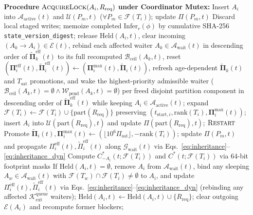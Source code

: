 \documentclass[conference,10pt]{IEEEtran}
\begin{document}
\begin{algorithm}[t]
\caption{EPCP Atomic Lock Acquisition \& Release}
\label{alg:epcp}
\begin{algorithmic}[1]
\small
\STATE \textbf{Procedure} $\textsc{AcquireLock}(A_i, R_{\text{req}})$ \textbf{under Coordinator Mutex:}
    \STATE Insert $A_i$ into $\mathcal{A}_{\text{active}}(t)$ and $\mathcal{U}(P_m, t)$ ($\forall P_m \in \mathcal{F}(T_i)$); update $\Pi(P_m, t)$
\ENDIF
{}
    \STATE Discard local staged writes; memoize completed $\text{Infer}_r(\phi)$ by cumulative SHA-256 \texttt{state\_version\_digest}; release $\text{Held}(A_i, t)$, clear incoming $(A_k \to A_i) \in \mathcal{E}(t)$, rebind each affected waiter $A_k \in \mathcal{A}_{\text{wait}}(t)$ in descending order of $\tilde{\mathbf{\Pi}}_k^{\text{eff}}(t)$ to its full recomputed $\mathcal{B}_{\text{ceil}}(A_k, t)$, reset $(\mathbf{\Pi}_i^{\text{eff}}(t), \tilde{\mathbf{\Pi}}_i^{\text{eff}}(t)) \leftarrow (\mathbf{\Pi}_i^{\max}(t), \tilde{\mathbf{\Pi}}_i(t))$, refresh age-dependent $\tilde{\mathbf{\Pi}}_k(t)$ and $T_{\text{sat}}$ promotions, and wake the highest-priority admissible waiter ($\mathcal{B}_{\text{ceil}}(A_k, t)=\emptyset \land \mathcal{W}_{\text{pend}}(A_k, t)=\emptyset$) per freed disjoint partition component in descending order of $\tilde{\mathbf{\Pi}}_k^{\text{eff}}(t)$ while keeping $A_i \in \mathcal{A}_{\text{active}}(t)$; expand $\mathcal{F}(T_i) \leftarrow \mathcal{F}(T_i) \cup \{\text{part}(R_{\text{req}})\}$ preserving $(t_{\text{start},i}, \text{rank}(T_i), \mathbf{\Pi}_i^{\max}(t))$; insert $A_i$ into $\mathcal{U}(\text{part}(R_{\text{req}}), t)$ and update $\Pi(\text{part}(R_{\text{req}}), t)$; \RETURN $\textsc{Restart}$
\ENDIF
\LOOP
        \STATE Promote $\tilde{\mathbf{\Pi}}_i(t), \mathbf{\Pi}_i^{\max}(t) \leftarrow (\lfloor 10^6 \Pi_{\text{sat}} \rfloor, -\text{rank}(T_i))$; update $\Pi(P_m, t)$ and propagate $\Pi_i^{\text{eff}}(t), \tilde{\Pi}_i^{\text{eff}}(t)$ along $\mathcal{G}_{\text{wait}}(t)$ via Eqs.~\eqref{eq:inheritance}--\eqref{eq:inheritance_dyn}
    \ENDIF
        \RETURN \TRUE
    \ENDIF
    \STATE Compute $C_{-A_i}^*(t; \mathcal{F}(T_i))$ and $C^*(t; \mathcal{F}(T_i))$ via 64-bit footprint masks
        \STATE If $\text{Held}(A_i, t) = \emptyset$, remove $A_i$ from $\mathcal{A}_{\text{wait}}(t)$, bind any sleeping $A_w \in \mathcal{A}_{\text{wait}}(t)$ with $\mathcal{F}(T_w) \cap \mathcal{F}(T_i) \ne \emptyset$ to $A_i$, and update $\Pi_i^{\text{eff}}(t), \tilde{\Pi}_i^{\text{eff}}(t)$ via Eqs.~\eqref{eq:inheritance}--\eqref{eq:inheritance_dyn} (rebinding any affected $\mathcal{K}_{\text{ext}}^{\text{queue}}$ waiters); $\text{Held}(A_i, t) \leftarrow \text{Held}(A_i, t) \cup \{R_{\text{req}}\}$; clear outgoing $\mathcal{E}(A_i)$ and recompute former blockers; \RETURN \TRUE

\end{algorithmic}
\end{algorithm}
\end{document}
